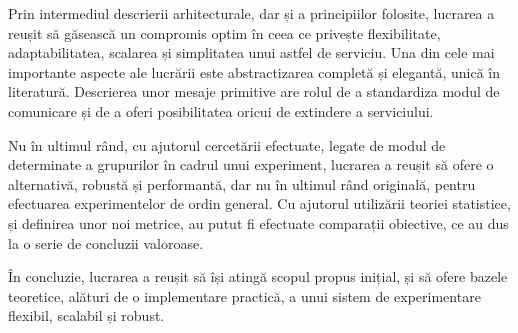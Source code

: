 Prin intermediul descrierii arhitecturale, dar și a principiilor folosite, lucrarea a reușit să găsească un compromis optim în ceea ce privește flexibilitate, adaptabilitatea, scalarea și simplitatea unui astfel de serviciu. Una din cele mai importante aspecte ale lucrării este abstractizarea completă și elegantă, unică în literatură. Descrierea unor mesaje primitive are rolul de a standardiza modul de comunicare și de a oferi posibilitatea oricui de extindere a serviciului.

Nu în ultimul rând, cu ajutorul cercetării efectuate, legate de modul de determinate a grupurilor în cadrul unui experiment, lucrarea a reușit să ofere o alternativă, robustă și performantă, dar nu în ultimul rând originală, pentru efectuarea experimentelor de ordin general. Cu ajutorul utilizării teoriei statistice, și definirea unor noi metrice, au putut fi efectuate comparații obiective, ce au dus la o serie de concluzii valoroase.

În concluzie, lucrarea a reușit să își atingă scopul propus inițial, și să ofere bazele teoretice, alături de o implementare practică, a unui sistem de experimentare flexibil, scalabil și robust.
